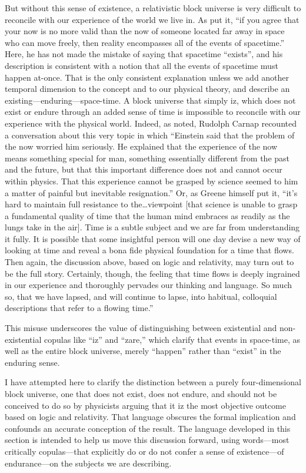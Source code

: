 \documentclass[aps,rmp,groupedaddress,twocolumn,10pt]{revtex4-2}
\begin{document}
But without this sense of existence, a relativistic block universe is very difficult to reconcile with our experience of the world we live in. As \citet{Greene2004} put it, ``if you agree that your now is no more valid than the now of someone located far away in space who can move freely, then reality encompasses all of the events of spacetime.'' Here, he has not made the mistake of saying that spacetime ``exists'', and his description is consistent with a notion that all the events of spacetime must happen at-once. That is the only consistent explanation unless we add another temporal dimension to the concept and to our physical theory, and describe an existing---enduring---space-time. A block universe that simply iz, which does not exist or endure through an added sense of time is impossible to reconcile with our experience with the physical world. Indeed, as \citet{Greene2004} noted, Rudolph Carnap recounted a conversation about this very topic in which ``Einstein said that the problem of the now worried him seriously. He explained that the experience of the now means something special for man, something essentially different from the past and the future, but that this important difference does not and cannot occur within physics. That this experience cannot be grasped by science seemed to him a matter of painful but inevitable resignation.'' Or, as Greene himself put it, ``it's hard to maintain full resistance to the\ldots viewpoint [that science is unable to grasp a fundamental quality of time that the human mind embraces as readily as the lungs take in the air]. Time is a subtle subject and we are far from understanding it fully. It is possible that some insightful person will one day devise a new way of looking at time and reveal a bona fide physical foundation for a time that flows. Then again, the discussion above, based on logic and relativity, may turn out to be the full story. Certainly, though, the feeling that time flows is deeply ingrained in our experience and thoroughly pervades our thinking and language. So much so, that we have lapsed, and will continue to lapse, into habitual, colloquial descriptions that refer to a flowing time.'' 

This misuse underscores the value of distinguishing between existential and non-existential copulas like ``iz'' and ``zare,'' which clarify that events in space-time, as well as the entire block universe, merely ``happen'' rather than ``exist'' in the enduring sense.

I have attempted here to clarify the distinction between a purely four-dimensional block universe, one that does not exist, does not endure, and should not be conceived to do so by physicists arguing that it iz the most objective outcome based on logic and relativity. That language obscures the formal implication and confounds an accurate conception of the result. The language developed in this section is intended to help us move this discussion forward, using words---most critically copulas---that explicitly do or do not confer a sense of existence---of endurance---on the subjects we are describing.
\end{document}
